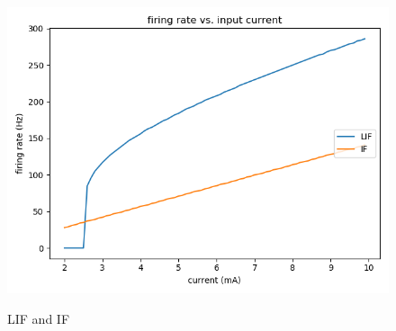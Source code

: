 \documentclass[11pt]{article}
\begin{document}
\begin{enumerate}
\begin{figure}[htb]
{			\includegraphics[scale=0.2]{plot_question_3.png}}
			\caption{LIF and IF}
			\end{figure}
		
	\end{enumerate}
	
\end{document}

